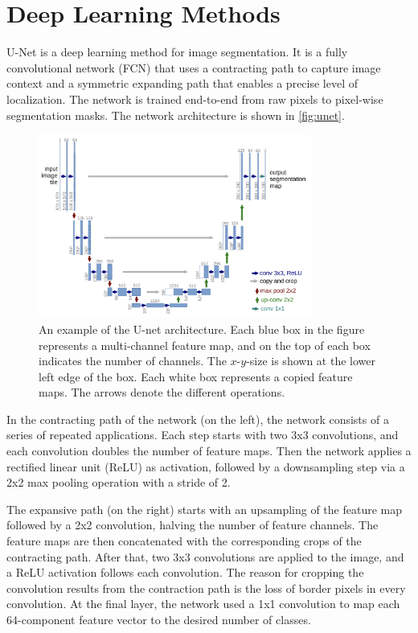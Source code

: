 \section{Deep Learning Methods}
U-Net \cite{ronneberger2015u} is a deep learning method for image segmentation. It is a fully convolutional network (FCN) \cite{long2015fully} that uses a contracting path to capture image context and a symmetric expanding path that enables a precise level of localization. The network is trained end-to-end from raw pixels to pixel-wise segmentation masks. The network architecture is shown in \autoref{fig:unet}. \medskip
\begin{figure}[H]
    \centering
    \includegraphics[width=0.8\textwidth]{./figures/unet.png}
    \caption{An example of the U-net architecture. Each blue
    box in the figure represents a multi-channel feature map, and on the top of each box indicates the number of channels. The \(x\)-\(y\)-size is shown at the lower left edge of the box. Each white box represents a copied feature maps. The arrows denote the different operations.}
    \label{fig:unet}
\end{figure}
\noindent In the contracting path of the network (on the left), the network consists of a series of repeated applications. Each step starts with two 3x3 convolutions, and each convolution doubles the number of feature maps. Then the network applies a rectified linear unit (ReLU) as activation, followed by a downsampling step via a 2x2 max pooling operation with a stride of 2. \medskip

\noindent The expansive path (on the right) starts with an upsampling of the feature map followed by a 2x2 convolution, halving the number of feature channels. The feature maps are then concatenated with the corresponding crops of the contracting path. After that, two 3x3 convolutions are applied to the image, and a ReLU activation follows each convolution. The reason for cropping the convolution results from the contraction path is the loss of border pixels in every convolution. At the final layer, the network used a 1x1 convolution to map each 64-component feature vector to the desired number of classes. \medskip

